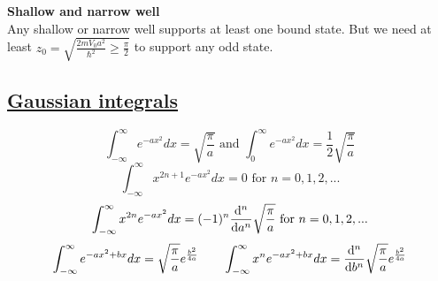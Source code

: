 \textbf{Shallow and narrow well} \\
Any shallow or narrow well supports at least one bound state. But we need at least $z_0 = \sqrt{\frac{2mV_0 a^2}{\hbar^2} \geq \frac{\pi}{2}}$ to support any odd state.

\subsection{\underline{Gaussian integrals}}
$$\int_{-\infty}^{\infty} e^{-ax^2} dx = \sqrt{\frac{\pi}{a}} \textrm{ and } \int_{0}^{\infty} e^{-ax^2} dx = \frac{1}{2} \sqrt{\frac{\pi}{a}}$$
$$\int_{-\infty}^{\infty} x^{2n+1} e^{-ax^2} dx = 0 \textrm { for } n = 0, 1, 2, ...$$
$$\int_{-\infty}^{\infty} x^{2n} e^{-ax^2} dx = (-1)^n \dv[n]{}{a} \sqrt{\frac{\pi}{a}} \textrm{ for } n = 0, 1, 2, ...$$
$$\int_{-\infty}^{\infty} e^{-ax^2 + bx} dx = \sqrt{\frac{\pi}{a}} e^{\frac{b^2}{4a}}  \qquad  \int_{-\infty}^{\infty} x^n e^{-ax^2 + bx} dx = \dv[n]{}{b} \sqrt{\frac{\pi}{a}} e^{\frac{b^2}{4a}}$$

